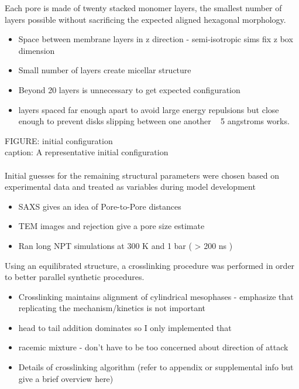 \documentclass{article}
\begin{document}
	Each pore is made of twenty stacked monomer layers, the smallest number of layers possible without sacrificing the expected aligned hexagonal morphology.
	\begin{itemize}
		\item Space between membrane layers in z direction - semi-isotropic sims fix z box dimension
		\item Small number of layers create micellar structure
		\item Beyond 20 layers is unnecessary to get expected configuration
		\item layers spaced far enough apart to avoid large energy repulsions but close enough to prevent disks slipping between one another ~ 5 angstroms works.
	\end{itemize}
	FIGURE: initial configuration \\
	caption: A representative initial configuration \\
	\\
	\noindent Initial guesses for the remaining structural parameters were chosen based on experimental data and treated as variables during model development 
	\begin{itemize}
		\item SAXS gives an idea of Pore-to-Pore distances
		\item TEM images and rejection give a pore size estimate
		\item Ran long NPT simulations at 300 K and 1 bar ( > 200 ns )
	\end{itemize}
	
	Using an equilibrated structure, a crosslinking procedure was performed in order to better parallel synthetic procedures. 
	\begin{itemize}
		\item Crosslinking maintains alignment of cylindrical mesophases - emphasize that replicating the mechanism/kinetics is not important 
		\item head to tail addition dominates so I only implemented that
		\item racemic mixture - don't have to be too concerned about direction of attack 
		\item Details of crosslinking algorithm (refer to appendix or supplemental info but give a brief overview here)
	\end{itemize}  
	
\end{document}

